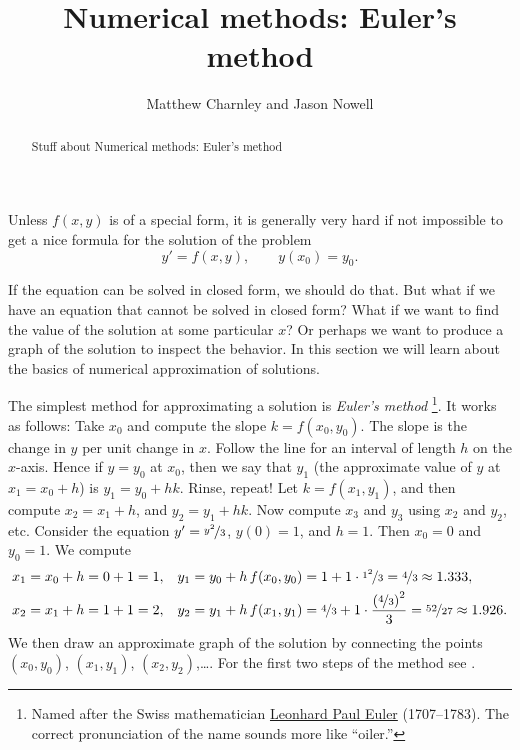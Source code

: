 \documentclass{ximera}
\title{Numerical methods: Euler's method}
\author{Matthew Charnley and Jason Nowell}
\begin{document}
\begin{abstract}
    Stuff about Numerical methods: Euler's method
\end{abstract}
\maketitle

\label{numer:section}



%


Unless $f(x,y)$ is of a special form, it is generally very hard if not impossible to get a nice formula for the solution of the problem
\begin{equation*}
    y' = f(x,y), \qquad y(x_0) = y_0 .
\end{equation*}

If the equation can be solved in closed form, we should do that. But what if we have an equation that cannot be solved in closed form? What if we want to find the value of the solution at some particular $x$? Or perhaps we want to produce a graph of the solution to inspect the behavior.  In this section we will learn about the basics of numerical approximation of solutions.

The simplest method for approximating a solution is \emph{Euler's method}%
\footnote{Named after the Swiss mathematician \href{https://en.wikipedia.org/wiki/Euler}{Leonhard Paul Euler} (1707--1783).  The correct pronunciation of the name sounds more like ``oiler.''}.  
It works as follows: Take $x_0$ and compute the slope $k = f(x_0,y_0)$.  The slope is the change in $y$ per unit change in $x$.  Follow the line for an interval of length $h$ on the $x$-axis.  Hence if $y = y_0$ at $x_0$, then we say that $y_1$ (the approximate value of $y$ at $x_1 = x_0 + h$) is $y_1 = y_0 + h k$. Rinse, repeat!  Let $k = f(x_1,y_1)$, and then compute $x_2 = x_1 + h$, and $y_2 = y_1 + h k$. Now compute $x_3$ and $y_3$ using $x_2$ and $y_2$, etc. Consider the equation $y' = \nicefrac{y^2}{3}$, $y(0)=1$, and $h=1$. Then $x_0=0$ and $y_0 = 1$.  We compute
\begin{align*}
    & x_1 = x_0 + h = 0 + 1 = 1, & & y_1 = y_0 + h \, f(x_0,y_0) = 1 + 1 \cdot
    \nicefrac{1^2}{3} = \nicefrac{4}{3} \approx 1.333,\\
    & x_2 = x_1 + h = 1 + 1 = 2, & & y_2 = y_1 + h \, f(x_1,y_1) =
    \nicefrac{4}{3} + 1 \cdot \frac{{(\nicefrac{4}{3})}^2}{3} =
    \nicefrac{52}{27} \approx 1.926.
\end{align*}
We then draw an approximate graph of the solution by connecting the points $(x_0,y_0)$, $(x_1,y_1)$, $(x_2,y_2)$,\dots. For the first two steps of the method see .
\end{document}
